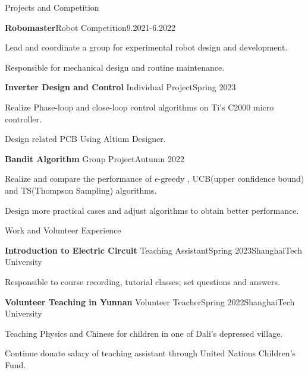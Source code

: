 \documentclass[]{kyvernitis-resume}
\begin{document}
\begin{section}{Projects and Competition}
    \begin{subsection}{\textbf{Robomaster}}{Robot Competition}{9.2021-6.2022}{}
        \item{Lead and coordinate a group for experimental robot design and development.}
         \item{Responsible for mechanical design and routine maintenance.}

    \end{subsection}
    \begin{subsection}{\textbf{Inverter Design and Control}}
    {Individual Project}{Spring 2023}{}
\item{Realize Phase-loop and close-loop control algorithms on Ti's C2000 micro controller.}
\item{Design related PCB Using Altium Designer.}
    \end{subsection}
        \begin{subsection}{\textbf{Bandit Algorithm}}
    {Group Project}{Autumn 2022}{}
\item{Realize and compare the performance of $\epsilon$-greedy , UCB(upper confidence bound) and TS(Thompson Sampling) algorithms.}
\item{ Design more practical cases and adjust algorithms to obtain better performance.}
\end{subsection}
\end{section}

\newpage

\begin{section}{Work and Volunteer Experience}
 \begin{subsection}{\textbf{Introduction to Electric Circuit}}
    {Teaching Assistant}{Spring 2023}{ShanghaiTech University}
\item{Responsible to course recording, tutorial classes; set questions and answers.}
    \end{subsection}
\begin{subsection}{\textbf{Volunteer Teaching in Yunnan}}
    {Volunteer Teacher}{Spring 2022}{ShanghaiTech University}
\item{Teaching Physics and Chinese for children in one of Dali's depressed village.}
\item{Continue donate salary of teaching assistant through United Nations Children's Fund.}
    \end{subsection}
\end{section}
\end{document}
